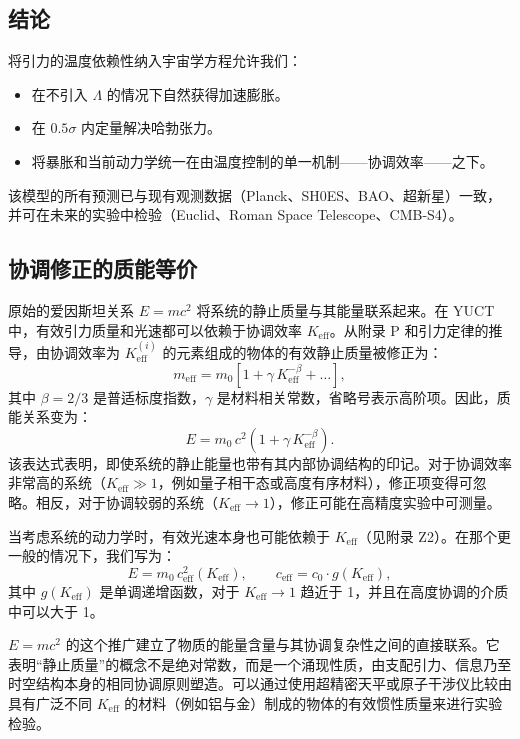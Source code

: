 \documentclass[12pt]{article}
\theoremstyle{remark}
\begin{document}
	\subsection{结论}
	
	将引力的温度依赖性纳入宇宙学方程允许我们：
	\begin{itemize}
		\item 在不引入 $\Lambda$ 的情况下自然获得加速膨胀。
		\item 在 $0.5\sigma$ 内定量解决哈勃张力。
		\item 将暴胀和当前动力学统一在由温度控制的单一机制——协调效率——之下。
	\end{itemize}
	该模型的所有预测已与现有观测数据（Planck、SH0ES、BAO、超新星）一致，并可在未来的实验中检验（Euclid、Roman Space Telescope、CMB-S4）。
	
	
	\subsection{协调修正的质能等价}
	\label{subsec:coord-emc2}
	
	原始的爱因斯坦关系 $E = m c^{2}$ 将系统的静止质量与其能量联系起来。在 YUCT 中，有效引力质量和光速都可以依赖于协调效率 $K_{\mathrm{eff}}$。从附录 P 和引力定律的推导，由协调效率为 $K_{\mathrm{eff}}^{(i)}$ 的元素组成的物体的有效静止质量被修正为：
	\[
	m_{\mathrm{eff}} = m_{0} \left[ 1 + \gamma \, K_{\mathrm{eff}}^{-\beta} + \dots \right],
	\]
	其中 $\beta = 2/3$ 是普适标度指数，$\gamma$ 是材料相关常数，省略号表示高阶项。因此，质能关系变为：
	\[
	\boxed{E = m_{0} \, c^{2} \left( 1 + \gamma \, K_{\mathrm{eff}}^{-\beta} \right)}.
	\]
	该表达式表明，即使系统的静止能量也带有其内部协调结构的印记。对于协调效率非常高的系统（$K_{\mathrm{eff}} \gg 1$，例如量子相干态或高度有序材料），修正项变得可忽略。相反，对于协调较弱的系统（$K_{\mathrm{eff}} \to 1$），修正可能在高精度实验中可测量。
	
	当考虑系统的动力学时，有效光速本身也可能依赖于 $K_{\mathrm{eff}}$（见附录 Z2）。在那个更一般的情况下，我们写为：
	\[
	E = m_{0} \, c_{\mathrm{eff}}^{2}(K_{\mathrm{eff}}),\qquad
	c_{\mathrm{eff}} = c_{0} \cdot g(K_{\mathrm{eff}}),
	\]
	其中 $g(K_{\mathrm{eff}})$ 是单调递增函数，对于 $K_{\mathrm{eff}} \to 1$ 趋近于 1，并且在高度协调的介质中可以大于 1。
	
	$E = mc^{2}$ 的这个推广建立了物质的能量含量与其协调复杂性之间的直接联系。它表明“静止质量”的概念不是绝对常数，而是一个涌现性质，由支配引力、信息乃至时空结构本身的相同协调原则塑造。可以通过使用超精密天平或原子干涉仪比较由具有广泛不同 $K_{\mathrm{eff}}$ 的材料（例如铝与金）制成的物体的有效惯性质量来进行实验检验。
	
\end{document}
